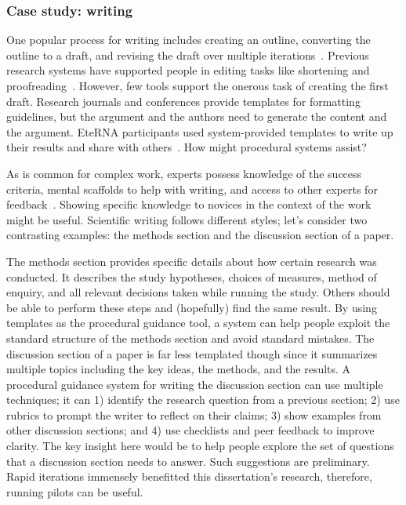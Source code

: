 \subsubsection{Case study: writing}
One popular process for writing includes creating an outline, converting the outline to a draft, and revising the draft over multiple iterations~\cite{zamel1982writing}. Previous research systems have supported people in editing tasks like shortening and proofreading~\cite{Bernstein2010a}. However, few tools support the onerous task of creating the first draft. Research journals and conferences provide templates for formatting guidelines, but the argument and the authors need to generate the content and the argument. EteRNA participants used system-provided templates to write up their results and share with others~\cite{Lee2014}. How might procedural systems assist?

As is common for complex work, experts possess knowledge of the success criteria, mental scaffolds to help with writing, and access to other experts for feedback~\cite{kellogg2006professional}. Showing specific knowledge to novices in the context of the work might be useful. Scientific writing follows different styles; let’s consider two contrasting examples: the methods section and the discussion section of a paper.

The methods section provides specific details about how certain research was conducted. It describes the study hypotheses, choices of measures, method of enquiry, and all relevant decisions taken while running the study. Others should be able to perform these steps and (hopefully) find the same result. By using templates as the procedural guidance tool, a system can help people exploit the standard structure of the methods section and avoid standard mistakes. The discussion section of a paper is far less templated though since it summarizes multiple topics including the key ideas, the methods, and the results. A procedural guidance system for writing the discussion section can use multiple techniques; it can 1) identify the research question from a previous section; 2) use rubrics to prompt the writer to reflect on their claims; 3) show examples from other discussion sections; and 4) use checklists and peer feedback to improve clarity. The key insight here would be to help people explore the set of questions that a discussion section needs to answer. Such suggestions are preliminary. Rapid iterations immensely benefitted this dissertation's research, therefore, running pilots can be useful.

